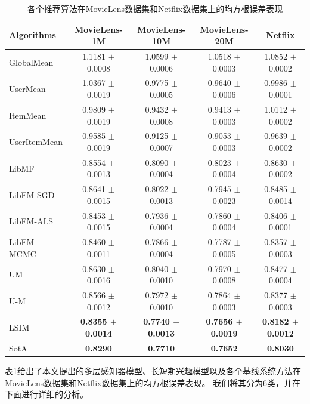 \begin{table}[htbp]
    \centering
    \caption{各个推荐算法在MovieLens数据集和Netflix数据集上的均方根误差表现}
    \label{tab:msre}
    \begin{tabular}{|l|c|c|c|c|}
        \hline
        \textbf{Algorithms} & \textbf{MovieLens-1M} & \textbf{MovieLens-10M} & \textbf{MovieLens-20M} & \textbf{Netflix} \\
        \hline
        GlobalMean   & 1.1181 $\pm$ 0.0008 & 1.0599 $\pm$ 0.0006 & 1.0518 $\pm$ 0.0003 & 1.0852 $\pm$ 0.0002 \\
        UserMean     & 1.0367 $\pm$ 0.0019 & 0.9775 $\pm$ 0.0005 & 0.9640 $\pm$ 0.0006 & 0.9986 $\pm$ 0.0001 \\
        ItemMean     & 0.9809 $\pm$ 0.0019 & 0.9432 $\pm$ 0.0008 & 0.9413 $\pm$ 0.0003 & 1.0112 $\pm$ 0.0002 \\
        UserItemMean & 0.9585 $\pm$ 0.0019 & 0.9125 $\pm$ 0.0007 & 0.9053 $\pm$ 0.0003 & 0.9639 $\pm$ 0.0002 \\
        \hline
        LibMF        & 0.8554 $\pm$ 0.0013 & 0.8090 $\pm$ 0.0004 & 0.8023 $\pm$ 0.0004 & 0.8630 $\pm$ 0.0002 \\
        \hline
        LibFM-SGD    & 0.8641 $\pm$ 0.0015 & 0.8022 $\pm$ 0.0013 & 0.7945 $\pm$ 0.0023 & 0.8485 $\pm$ 0.0014 \\
        LibFM-ALS    & 0.8453 $\pm$ 0.0015 & 0.7936 $\pm$ 0.0004 & 0.7860 $\pm$ 0.0004 & 0.8406 $\pm$ 0.0001 \\
        LibFM-MCMC   & 0.8460 $\pm$ 0.0011 & 0.7866 $\pm$ 0.0004 & 0.7787 $\pm$ 0.0005 & 0.8357 $\pm$ 0.0003 \\
        \hline
        UM           & 0.8630 $\pm$ 0.0016 & 0.8040 $\pm$ 0.0010 & 0.7970 $\pm$ 0.0008 & 0.8477 $\pm$ 0.0004 \\
        U-M          & 0.8566 $\pm$ 0.0012 & 0.7972 $\pm$ 0.0010 & 0.7864 $\pm$ 0.0003 & 0.8377 $\pm$ 0.0003 \\
        \hline
        LSIM         & \textbf{0.8355 $\pm$ 0.0014} & \textbf{0.7740 $\pm$ 0.0013} & \textbf{0.7656 $\pm$ 0.0019} & \textbf{0.8182 $\pm$ 0.0012} \\
        \hline
        SotA         & \textbf{0.8290} & \textbf{0.7710} & \textbf{0.7652} & \textbf{0.8030} \\
        \hline
    \end{tabular}
\end{table}

表\ref{tab:msre}给出了本文提出的多层感知器模型、长短期兴趣模型以及各个基线系统方法在MovieLens数据集和Netflix数据集上的均方根误差表现。
我们将其分为$6$类，并在下面进行详细的分析。


